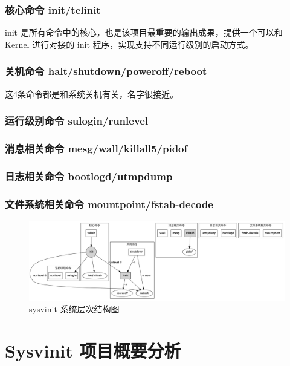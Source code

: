 \subsection{核心命令 init/telinit}

init 是所有命令中的核心，也是该项目最重要的输出成果，提供一个可以和 Kernel
进行对接的 init 程序，实现支持不同运行级别的启动方式。

\subsection{关机命令 halt/shutdown/poweroff/reboot}

这4条命令都是和系统关机有关，名字很接近。

\subsection{运行级别命令 sulogin/runlevel}

\subsection{消息相关命令 mesg/wall/killall5/pidof}

\subsection{日志相关命令 bootlogd/utmpdump}

\subsection{文件系统相关命令 mountpoint/fstab-decode}

\begin{figure}[htbp]
\centering
\includegraphics{./figures/sys.png}
\caption{sysvinit 系统层次结构图}
\end{figure}

\chapter{Sysvinit 项目概要分析}

